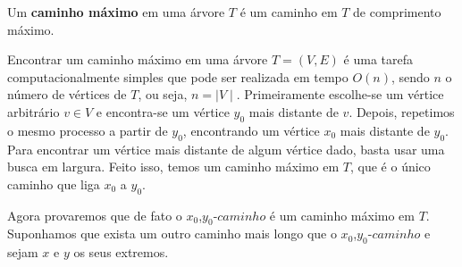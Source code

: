 \documentclass[a4paper,12pt]{article}
\begin{document}
	Um \textbf{caminho máximo} em uma árvore $T$ é um caminho em 
	$T$ de comprimento máximo.

	Encontrar um caminho máximo em uma árvore $T=(V,E)$ é uma tarefa
	computacionalmente simples que pode ser realizada em tempo 
	$O(n)$, sendo $n$ o número de vértices de $T$, ou seja, 
	$n = \mid V\mid$. 
	Primeiramente escolhe-se um vértice arbitrário
	$v \in V$ e encontra-se um vértice $y_0$ mais distante de 
	$v$.
	Depois, repetimos o mesmo processo a partir de $y_0$, 
	encontrando um vértice
	$x_0$ mais distante de $y_0$. 
	Para encontrar um vértice mais distante de algum vértice dado, 
	basta usar uma busca em largura.  
	Feito isso, temos um caminho máximo em $T$, que é o único
	caminho que liga $x_0$ a $y_0$.


	Agora provaremos que de fato o $x_0$,$y_0$-$caminho$ é um caminho 
	máximo em $T$.
	Suponhamos que exista um outro caminho mais longo que o
	$x_0$,$y_0$-$caminho$ e sejam $x$ e $y$ os seus extremos.
\end{document}
